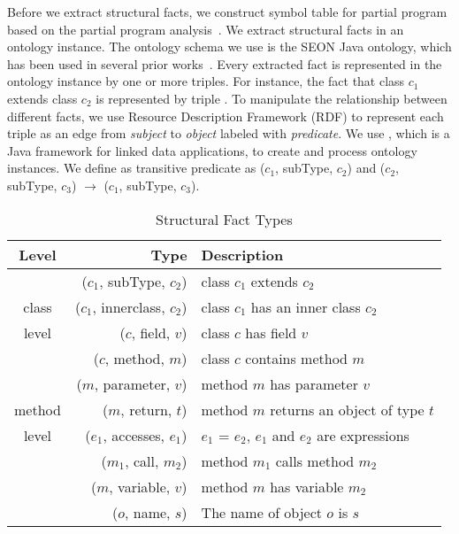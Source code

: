   Before we extract structural facts, we construct symbol table for partial program based on the partial program analysis~\cite{partialProgram:OOPSLA08}.  We extract structural facts in an ontology instance. The ontology schema we use is the SEON Java ontology, which has been used in several prior works~\cite{gall:seonICSE10, Murphy:nlConcern11}.  Every extracted fact is represented in the ontology instance by one or more   triples. For instance, the fact that class $c_1$ extends class $c_2$ is represented by triple . To manipulate the relationship between different facts, we use Resource Description Framework (RDF)  to represent each  triple as an edge from \textit{subject} to \textit{object} labeled with {\it predicate}. We use , which is a Java framework for  linked data applications,  to create and process ontology instances. We define  as  transitive predicate as ($c_1$, subType, $c_2$) and ($c_2$, subType, $c_3$) $\rightarrow$  ($c_1$, subType, $c_3$). 


\begin{table}[ht]
\begin{center}
\caption{Structural Fact Types}
\label{tab:total}
\vspace{1mm}
\scriptsize{
\begin{tabular*}{0.5\textwidth}{@{}c|r|l@{}} \hline
Level&Type&Description\\\hline
&($c_1$, subType, $c_2$)& class $c_1$ extends $c_2$ \\
class&($c_1$, innerclass, $c_2$)& class $c_1$ has an inner class $c_2$ \\
level&($c$, field, $v$)& class $c$ has field $v$ \\ 
&($c$, method, $m$)& class $c$ contains method $m$ \\ \hline
&($m$, parameter, $v$)& method  $m$ has parameter $v$ \\ 
method&($m$, return, $t$)& method  $m$ returns an object of type $t$ \\ 
level&($e_1$, accesses, $e_1$)& $e_1$ = $e_2$, $e_1$ and $e_2$ are expressions\\ 
&($m_1$, call, $m_2$)& method  $m_1$ calls method $m_2$ \\ 
&($m$, variable, $v$)& method  $m$ has variable $m_2$ \\  \hline
&($o$, name, $s$)& The name of object  $o$ is  $s$ \\  \hline
\end{tabular*}
 \label{tab:dataset}
}
 \end{center}
\end{table}


